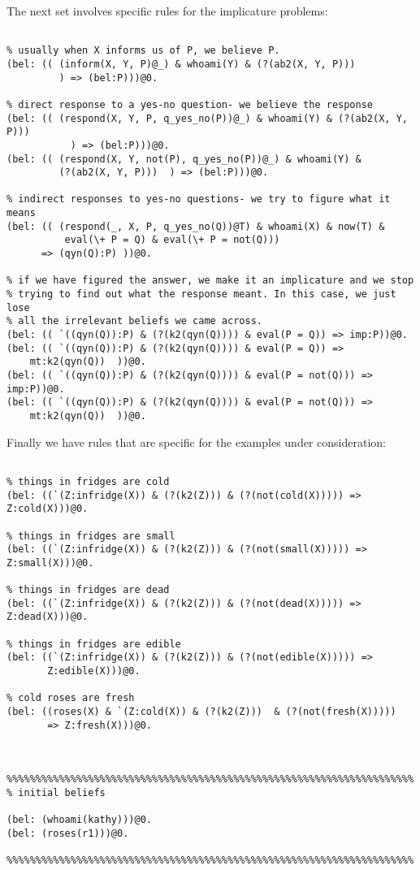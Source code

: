 \documentclass{article}
\begin{document}
The next set involves specific rules for the implicature problems:

\begin{verbatim}

% usually when X informs us of P, we believe P.
(bel: (( (inform(X, Y, P)@_) & whoami(Y) & (?(ab2(X, Y, P)))
         ) => (bel:P)))@0.

% direct response to a yes-no question- we believe the response
(bel: (( (respond(X, Y, P, q_yes_no(P))@_) & whoami(Y) & (?(ab2(X, Y, P)))
           ) => (bel:P)))@0.
(bel: (( (respond(X, Y, not(P), q_yes_no(P))@_) & whoami(Y) & 
         (?(ab2(X, Y, P)))  ) => (bel:P)))@0.

% indirect responses to yes-no questions- we try to figure what it means
(bel: (( (respond(_, X, P, q_yes_no(Q))@T) & whoami(X) & now(T) &
          eval(\+ P = Q) & eval(\+ P = not(Q)))
      => (qyn(Q):P) ))@0.

% if we have figured the answer, we make it an implicature and we stop
% trying to find out what the response meant. In this case, we just lose
% all the irrelevant beliefs we came across.
(bel: (( `((qyn(Q)):P) & (?(k2(qyn(Q)))) & eval(P = Q)) => imp:P))@0.
(bel: (( `((qyn(Q)):P) & (?(k2(qyn(Q)))) & eval(P = Q)) => 
    mt:k2(qyn(Q))  ))@0.
(bel: (( `((qyn(Q)):P) & (?(k2(qyn(Q)))) & eval(P = not(Q))) => imp:P))@0.
(bel: (( `((qyn(Q)):P) & (?(k2(qyn(Q)))) & eval(P = not(Q))) => 
    mt:k2(qyn(Q))  ))@0.

\end{verbatim}

Finally we have rules that are specific for the examples under
consideration: 

\begin{verbatim}

% things in fridges are cold
(bel: ((`(Z:infridge(X)) & (?(k2(Z))) & (?(not(cold(X))))) => Z:cold(X)))@0.

% things in fridges are small
(bel: ((`(Z:infridge(X)) & (?(k2(Z))) & (?(not(small(X))))) => Z:small(X)))@0.

% things in fridges are dead
(bel: ((`(Z:infridge(X)) & (?(k2(Z))) & (?(not(dead(X))))) => Z:dead(X)))@0.

% things in fridges are edible
(bel: ((`(Z:infridge(X)) & (?(k2(Z))) & (?(not(edible(X))))) => 
       Z:edible(X)))@0.

% cold roses are fresh
(bel: ((roses(X) & `(Z:cold(X)) & (?(k2(Z)))  & (?(not(fresh(X)))))
       => Z:fresh(X)))@0.



%%%%%%%%%%%%%%%%%%%%%%%%%%%%%%%%%%%%%%%%%%%%%%%%%%%%%%%%%%%%%%%%%%%%%%
% initial beliefs

(bel: (whoami(kathy)))@0.
(bel: (roses(r1)))@0.

%%%%%%%%%%%%%%%%%%%%%%%%%%%%%%%%%%%%%%%%%%%%%%%%%%%%%%%%%%%%%%%%%%%%%%
\end{verbatim}
\end{document}
